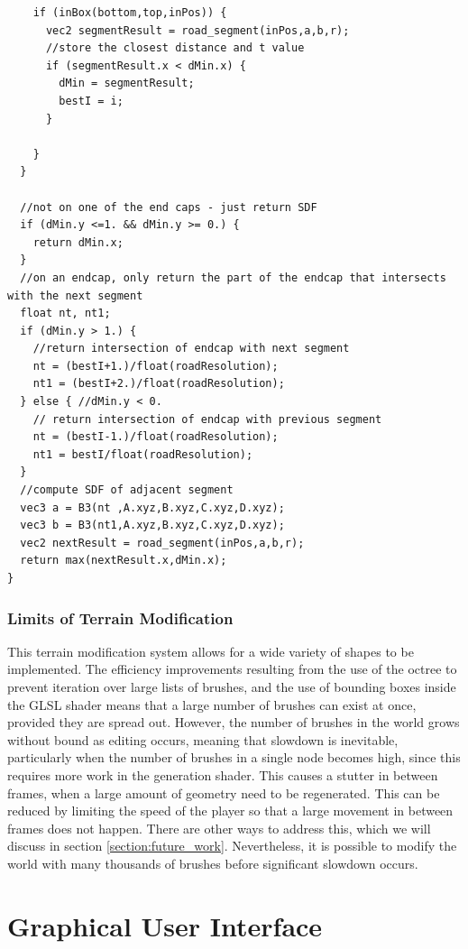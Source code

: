 \documentclass[11pt]{article}
\begin{document}
\begin{lstlisting}
    if (inBox(bottom,top,inPos)) {
      vec2 segmentResult = road_segment(inPos,a,b,r);
      //store the closest distance and t value
      if (segmentResult.x < dMin.x) {
        dMin = segmentResult;
        bestI = i;
      }

    }
  }
    
  //not on one of the end caps - just return SDF
  if (dMin.y <=1. && dMin.y >= 0.) {
    return dMin.x;
  }
  //on an endcap, only return the part of the endcap that intersects with the next segment
  float nt, nt1;
  if (dMin.y > 1.) {
    //return intersection of endcap with next segment
    nt = (bestI+1.)/float(roadResolution);
    nt1 = (bestI+2.)/float(roadResolution);
  } else { //dMin.y < 0.
    // return intersection of endcap with previous segment
    nt = (bestI-1.)/float(roadResolution);
    nt1 = bestI/float(roadResolution);
  }
  //compute SDF of adjacent segment
  vec3 a = B3(nt ,A.xyz,B.xyz,C.xyz,D.xyz);
  vec3 b = B3(nt1,A.xyz,B.xyz,C.xyz,D.xyz);
  vec2 nextResult = road_segment(inPos,a,b,r);
  return max(nextResult.x,dMin.x);
}
\end{lstlisting}


\subsubsection{Limits of Terrain Modification}
\label{edit_limits}
This terrain modification system allows for a wide variety of shapes to be implemented. The efficiency improvements resulting from the use of the octree to prevent iteration over large lists of brushes, and the use of bounding boxes inside the GLSL shader means that a large number of brushes can exist at once, provided they are spread out. However, the number of brushes in the world grows without bound as editing occurs, meaning that slowdown is inevitable, particularly when the number of brushes in a single node becomes high, since this requires more work in the generation shader. This causes a stutter in between frames, when a large amount of geometry need to be regenerated. This can be reduced by limiting the speed of the player so that a large movement in between frames does not happen. There are other ways to address this, which we will discuss in section \ref{section:future_work}. Nevertheless, it is possible to modify the world with many thousands of brushes before significant slowdown occurs.

\section{Graphical User Interface}
\end{document}
